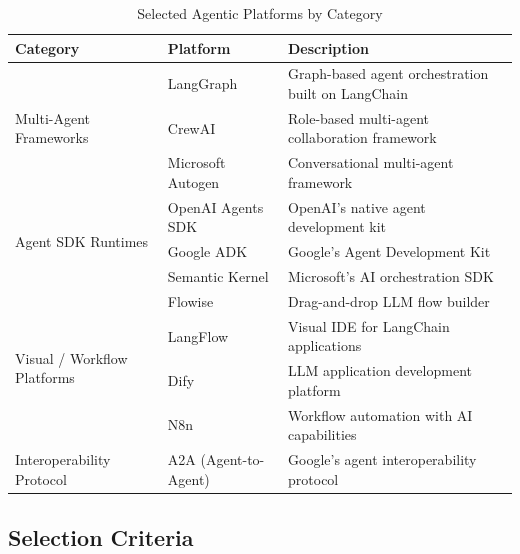 \documentclass[]
{UCD_CS_FYP_Report}
\begin{document}
\begin{table}[H]
  \centering
  \begin{tabular}{|l|l|p{6cm}|}
    \hline
    \textbf{Category}                            & \textbf{Platform}    & \textbf{Description}                               \\
    \hline
    \multirow{3}{*}{Multi-Agent Frameworks}      & LangGraph            & Graph-based agent orchestration built on LangChain \\
    \cline{2-3}
                                                 & CrewAI               & Role-based multi-agent collaboration framework     \\
    \cline{2-3}
                                                 & Microsoft Autogen    & Conversational multi-agent framework               \\
    \hline
    \multirow{3}{*}{Agent SDK Runtimes}          & OpenAI Agents SDK    & OpenAI's native agent development kit              \\
    \cline{2-3}
                                                 & Google ADK           & Google's Agent Development Kit                     \\
    \cline{2-3}
                                                 & Semantic Kernel      & Microsoft's AI orchestration SDK                   \\
    \hline
    \multirow{4}{*}{Visual / Workflow Platforms} & Flowise              & Drag-and-drop LLM flow builder                     \\
    \cline{2-3}
                                                 & LangFlow             & Visual IDE for LangChain applications              \\
    \cline{2-3}
                                                 & Dify                 & LLM application development platform               \\
    \cline{2-3}
                                                 & N8n                  & Workflow automation with AI capabilities           \\
    \hline
    Interoperability Protocol                    & A2A (Agent-to-Agent) & Google's agent interoperability protocol           \\
    \hline
  \end{tabular}
  \caption{Selected Agentic Platforms by Category}
\end{table}

\subsection{Selection Criteria}
\end{document}
